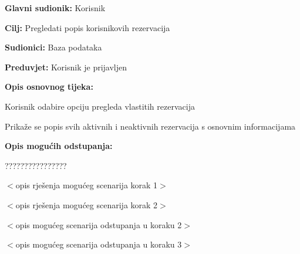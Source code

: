 \noindent {}
\begin{packed_item}
	
	\item \textbf{Glavni sudionik: } Korisnik
	\item  \textbf{Cilj:} Pregledati popis korisnikovih rezervacija
	\item  \textbf{Sudionici:} Baza podataka
	\item  \textbf{Preduvjet:} Korisnik je prijavljen
	\item  \textbf{Opis osnovnog tijeka:}
	
	\item[] \begin{packed_enum}
		
		\item Korisnik odabire opciju pregleda vlastitih rezervacija
		\item Prikaže se popis svih aktivnih i neaktivnih rezervacija s osnovnim informacijama

	\end{packed_enum}
	
	\item  \textbf{Opis mogućih odstupanja:}
	
	\item[] \begin{packed_item}
		
		\item[2.a] ????????????????
		\item[] \begin{packed_enum}
			
			\item $<$opis rješenja mogućeg scenarija korak 1$>$
			\item $<$opis rješenja mogućeg scenarija korak 2$>$
			
		\end{packed_enum}
		\item[2.b] $<$opis mogućeg scenarija odstupanja u koraku 2$>$
		\item[3.a] $<$opis mogućeg scenarija odstupanja  u koraku 3$>$
		
	\end{packed_item}
\end{packed_item}

